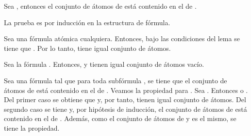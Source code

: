 \begin{isabellebody}
\begin{isamarkuptext}

  \begin{lema}
    Sea , entonces el conjunto de átomos de  está 
    contenido en el de .
  \end{lema} 


  \begin{demostracion}
  La prueba es por inducción en la estructura de fórmula.
  
  Sea  una fórmula atómica cualquiera. Entonces, bajo las
  condiciones del lema se tiene que . Por lo tanto, tiene igual
  conjunto de átomos.

  Sea la fórmula \isa{{\isasymbottom}}. Entonces,  y tienen igual conjunto de
  átomos vacío.

  Sea una fórmula  tal que para toda subfórmula , se tiene que el
  conjunto de átomos de  está contenido en el de . Veamos la
  propiedad para . Sea . 
  Entonces  o . 
  Del primer caso se obtiene que  y, por tanto, tienen igual 
  conjunto de átomos. Del segundo caso se tiene  y, por 
  hipótesis de inducción, el conjunto de átomos de  está contenido 
  en el de . Además, como el conjunto de átomos de  y  es el 
  mismo, se tiene la propiedad.


\end{demostracion}
\end{isamarkuptext}
\end{isabellebody}
